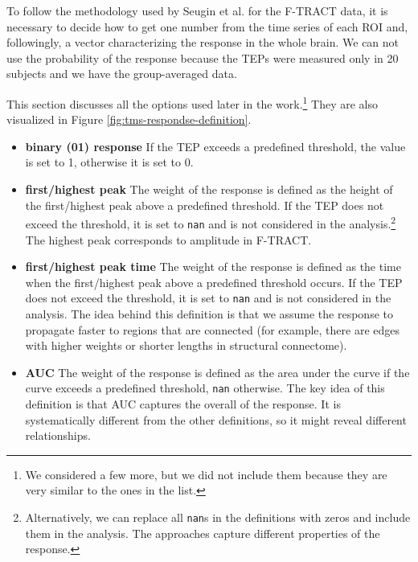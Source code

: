 To follow the methodology used by Seugin et al. for the F-TRACT data, it is necessary to decide how to get one number from the time series of each ROI and, followingly, a vector characterizing the response in the whole brain. We can not use the probability of the response because the TEPs were measured only in 20 subjects and we have the group-averaged data.

This section discusses all the options used later in the work.\footnote{We considered a few more, but we did not include them because they are very similar to the ones in the list.} They are also visualized in Figure \ref{fig:tms-respondse-definition}.

\begin{itemize}
    \item \textbf{binary (01) response} If the TEP exceeds a predefined threshold, the value is set to 1, otherwise it is set to 0.
    \item \textbf{first/highest peak} The weight of the response is defined as the height of the first/highest peak above a predefined threshold. If the TEP does not exceed the threshold, it is set to \texttt{nan} and is not considered in the analysis.\footnote{Alternatively, we can replace all \texttt{nan}s in the definitions with zeros and include them in the analysis. The approaches capture different properties of the response.} The highest peak corresponds to amplitude in F-TRACT. 
    \item \textbf{first/highest peak time} The weight of the response is defined as the time when the first/highest peak above a predefined threshold occurs. If the TEP does not exceed the threshold, it is set to \texttt{nan} and is not considered in the analysis. The idea behind this definition is that we assume the response to propagate faster to regions that are  connected (for example, there are edges with higher weights or shorter lengths in structural connectome).
    \item \textbf{AUC} The weight of the response is defined as the area under the curve if the curve exceeds a predefined threshold, \texttt{nan} otherwise. The key idea of this definition is that AUC captures the overall  of the response. It is systematically different from the other definitions, so it might reveal different relationships.
\end{itemize}

